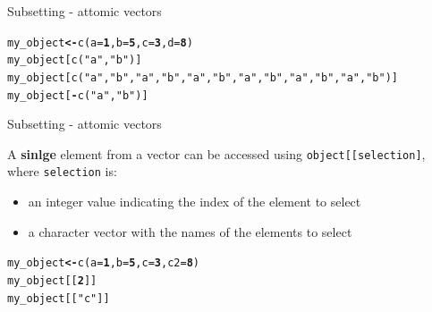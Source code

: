 \documentclass{beamer}\usepackage[]{graphicx}\usepackage[]{color}
\makeatletter
\newcommand{\hlnum}[1]{\textcolor[rgb]{0.502,0,0.502}{\textbf{#1}}}%
\newcommand{\hlstr}[1]{\textcolor[rgb]{0.651,0.522,0}{#1}}%
\newcommand{\hlopt}[1]{\textcolor[rgb]{1,0,0.502}{\textbf{#1}}}%
\newcommand{\hlstd}[1]{\textcolor[rgb]{0,0,0}{#1}}%
\newcommand{\hlkwb}[1]{\textcolor[rgb]{0.502,0.502,0.753}{\textbf{#1}}}%
\newcommand{\hlkwc}[1]{\textcolor[rgb]{0,0.502,0.753}{#1}}%
\newcommand{\hlkwd}[1]{\textcolor[rgb]{0,0.267,0.4}{#1}}%
\newenvironment{kframe}{%
 \def\at@end@of@kframe{}%
 \ifinner\ifhmode%
  \def\at@end@of@kframe{\end{minipage}}%
  \begin{minipage}{\columnwidth}%
 \fi\fi%
 \def\FrameCommand##1{\hskip\@totalleftmargin \hskip-\fboxsep
 \colorbox{shadecolor}{##1}\hskip-\fboxsep
     \hskip-\linewidth \hskip-\@totalleftmargin \hskip\columnwidth}%
 \MakeFramed {\advance\hsize-\width
   \@totalleftmargin\z@ \linewidth\hsize
   \@setminipage}}%
 {\par\unskip\endMakeFramed%
 \at@end@of@kframe}
\newenvironment{knitrout}{}{} %
\makeatother
\begin{document}
\begin{frame}[fragile]{Subsetting - attomic vectors}
\begin{knitrout}
\color{fgcolor}\begin{kframe}
\begin{alltt}
\hlstd{my_object} \hlkwb{<-} \hlkwd{c}\hlstd{(}\hlkwc{a} \hlstd{=} \hlnum{1}\hlstd{,} \hlkwc{b} \hlstd{=} \hlnum{5}\hlstd{,} \hlkwc{c} \hlstd{=} \hlnum{3}\hlstd{,} \hlkwc{d} \hlstd{=} \hlnum{8}\hlstd{)}
\hlstd{my_object[}\hlkwd{c}\hlstd{(}\hlstr{"a"}\hlstd{,} \hlstr{"b"}\hlstd{)]}
\hlstd{my_object[}\hlkwd{c}\hlstd{(}\hlstr{"a"}\hlstd{,} \hlstr{"b"}\hlstd{,} \hlstr{"a"}\hlstd{,} \hlstr{"b"}\hlstd{,} \hlstr{"a"}\hlstd{,} \hlstr{"b"}\hlstd{,} \hlstr{"a"}\hlstd{,} \hlstr{"b"}\hlstd{,} \hlstr{"a"}\hlstd{,} \hlstr{"b"}\hlstd{,} \hlstr{"a"}\hlstd{,} \hlstr{"b"}\hlstd{)]}
\hlstd{my_object[}\hlopt{-}\hlkwd{c}\hlstd{(}\hlstr{"a"}\hlstd{,} \hlstr{"b"}\hlstd{)]}
\end{alltt}


{\ttfamily\noindent\bfseries{}}\end{kframe}
\end{knitrout}

\end{frame}



\begin{frame}[fragile]{Subsetting - attomic vectors}

A \textbf{sinlge} element from a vector can be accessed using \texttt{object[[selection]}, where \texttt{selection} is:

\begin{itemize}
  \item an integer value indicating the index of the element to select
  \item a character vector with the names of the elements to select
\end{itemize}

\begin{knitrout}
\color{fgcolor}\begin{kframe}
\begin{alltt}
\hlstd{my_object} \hlkwb{<-} \hlkwd{c}\hlstd{(}\hlkwc{a} \hlstd{=} \hlnum{1}\hlstd{,} \hlkwc{b} \hlstd{=} \hlnum{5}\hlstd{,} \hlkwc{c} \hlstd{=} \hlnum{3}\hlstd{,} \hlkwc{c2} \hlstd{=} \hlnum{8}\hlstd{)}
\hlstd{my_object[[}\hlnum{2}\hlstd{]]}
\hlstd{my_object[[}\hlstr{"c"}\hlstd{]]}
\end{alltt}
\end{kframe}
\end{knitrout}

\end{frame}
\end{document}
